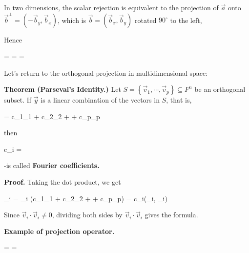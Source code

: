 \documentclass{article}
\begin{document}
In two dimensions, the scalar rejection is equivalent to the projection of $\vec{a}$ onto $\vec{b}^{\perp} = (-\vec{b}_{y}, \vec{b}_{x})$, which is $\vec{b} = (\vec{b}_{x}, \vec{b}_{y})$ rotated $90^{\circ}$ to the left,

Hence

\beq
\vert {} \vert = \vert {} \vert \sin \theta =  = 
\eeq

Let's return to the orthogonal projection in multidimensional space:


\textbf{Theorem (Parseval's Identity.)} Let $S = \left\lbrace \vec{v}_{1}, \cdots, \vec{v}_{p} \right\rbrace \subseteq F^{n}$ be an orthogonal subset. If $\vec{y}$ is a linear combination of the vectors in $S$, that is,

\beq
{} = c_{1}_{1} + c_{2}_{2} + \cdots + c_{p}_{p}
\eeq

then

\beq
c_{i} = 
\eeq

-is called \textbf{Fourier coefficients.}


\textbf{Proof.} Taking the dot product, we get

\beq
{}_{i} \cdot {} = _{i} (c_{1}_{1} + c_{2}_{2 + \cdots + c_{p}_{p}}) = c_{i}(_{i}, _{i})
\eeq


Since $\vec{v}_{i} \cdot \vec{v}_{i} \neq 0$, dividing both sides by $\vec{v}_{i} \cdot \vec{v}_{i}$ gives the formula.






\textbf{Example of projection operator.}


\beq
{} = 
\left[
	\begin{array}{c c c}
		1 & 0 & 0 \\
		0 & 1 & 0 \\
		0 & 0 & 0 \\
	\end{array}
\right]
\left[
	\begin{array}{c}
		x \\
		y \\
		z
	\end{array}
\right] = 
\left[
	\begin{array}{c}
		x \\
		y \\
		0
	\end{array}
\right]
\eeq
\end{document}
